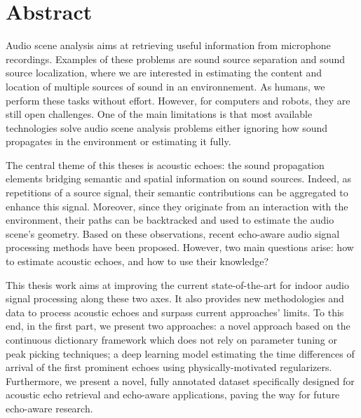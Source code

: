\chapter*{Abstract}

Audio scene analysis aims at retrieving useful information from microphone recordings.
Examples of these problems are sound source separation and sound source localization, where we are interested in estimating the content and location of multiple sources of sound in an environnement.
As humans, we perform these tasks without effort. However, for computers and robots, they are still open challenges.
One of the main limitations is that most available technologies solve audio scene analysis problems either ignoring how sound propagates in the environment or estimating it fully.

\mynewline
The central theme of this theses is acoustic echoes: the sound propagation elements bridging semantic and spatial information on sound sources.
Indeed, as repetitions of a source signal, their semantic contributions can be aggregated to enhance this signal.
Moreover, since they originate from an interaction with the environment, their paths can be backtracked and used to estimate the audio scene's geometry.
Based on these observations, recent echo-aware audio signal processing methods have been proposed.
However, two main questions arise: how to estimate acoustic echoes, and how to use their knowledge?

\mynewline
This thesis work aims at improving the current state-of-the-art for indoor audio signal processing along these two axes.
It also provides new methodologies and data to process acoustic echoes and surpass current approaches' limits.
To this end, in the first part, we present two approaches:
a novel approach based on the  continuous dictionary framework which does not rely on parameter tuning or peak picking techniques;
a deep learning model estimating the time differences of arrival of the first prominent echoes using physically-motivated regularizers.
Furthermore, we present a novel, fully annotated dataset specifically designed for acoustic echo retrieval and echo-aware applications, paving the way for future echo-aware research.

